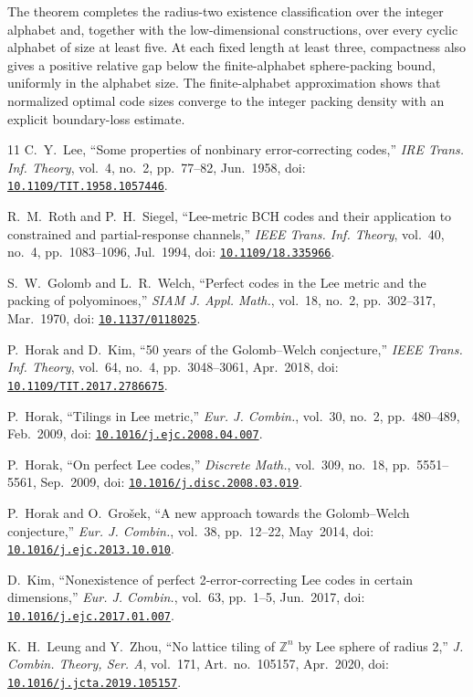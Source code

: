 \documentclass[12pt,letterpaper,onecolumn]{article}
\newcommand{\doi}[1]{\href{https://doi.org/#1}{\nolinkurl{#1}}}
\theoremstyle{definition}
\begin{document}
The theorem completes the radius-two existence classification over the integer alphabet and, together with the low-dimensional constructions, over every cyclic alphabet of size at least five. At each fixed length at least three, compactness also gives a positive relative gap below the finite-alphabet sphere-packing bound, uniformly in the alphabet size. The finite-alphabet approximation shows that normalized optimal code sizes converge to the integer packing density with an explicit boundary-loss estimate.


\begin{thebibliography}{11}
C.~Y.~Lee, ``Some properties of nonbinary error-correcting codes,'' \emph{IRE Trans. Inf. Theory}, vol.~4, no.~2, pp.~77--82, Jun.~1958, doi: \doi{10.1109/TIT.1958.1057446}.

R.~M.~Roth and P.~H.~Siegel, ``Lee-metric BCH codes and their application to constrained and partial-response channels,'' \emph{IEEE Trans. Inf. Theory}, vol.~40, no.~4, pp.~1083--1096, Jul.~1994, doi: \doi{10.1109/18.335966}.

S.~W.~Golomb and L.~R.~Welch, ``Perfect codes in the Lee metric and the packing of polyominoes,'' \emph{SIAM J. Appl. Math.}, vol.~18, no.~2, pp.~302--317, Mar.~1970, doi: \doi{10.1137/0118025}.

P.~Horak and D.~Kim, ``50 years of the Golomb--Welch conjecture,'' \emph{IEEE Trans. Inf. Theory}, vol.~64, no.~4, pp.~3048--3061, Apr.~2018, doi: \doi{10.1109/TIT.2017.2786675}.

P.~Horak, ``Tilings in Lee metric,'' \emph{Eur. J. Combin.}, vol.~30, no.~2, pp.~480--489, Feb.~2009, doi: \doi{10.1016/j.ejc.2008.04.007}.

P.~Horak, ``On perfect Lee codes,'' \emph{Discrete Math.}, vol.~309, no.~18, pp.~5551--5561, Sep.~2009, doi: \doi{10.1016/j.disc.2008.03.019}.

P.~Horak and O.~Gro\v{s}ek, ``A new approach towards the Golomb--Welch conjecture,'' \emph{Eur. J. Combin.}, vol.~38, pp.~12--22, May~2014, doi: \doi{10.1016/j.ejc.2013.10.010}.

D.~Kim, ``Nonexistence of perfect 2-error-correcting Lee codes in certain dimensions,'' \emph{Eur. J. Combin.}, vol.~63, pp.~1--5, Jun.~2017, doi: \doi{10.1016/j.ejc.2017.01.007}.

K.~H.~Leung and Y.~Zhou, ``No lattice tiling of $\mathbb Z^n$ by Lee sphere of radius 2,'' \emph{J. Combin. Theory, Ser. A}, vol.~171, Art.~no.~105157, Apr.~2020, doi: \doi{10.1016/j.jcta.2019.105157}.


\end{thebibliography}
\end{document}
